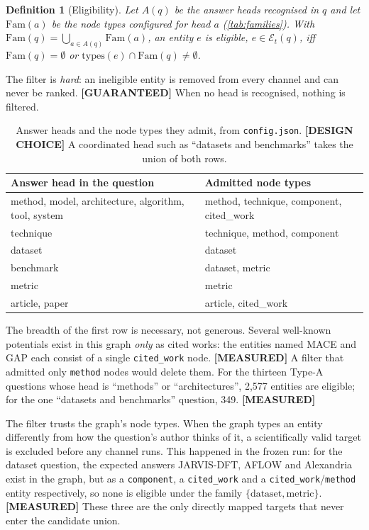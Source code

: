 \documentclass[11pt,a4paper]{article}
\newcommand{\cref}[1]{\autoref{#1}}
\newtheorem{definition}{Definition}[section]
\theoremstyle{remark}
\newcommand{\code}[1]{\texttt{\small #1}}
\newcommand{\Ent}{\mathcal{E}}
\newcommand{\vtag}[2]{{\sffamily\scriptsize\bfseries\textcolor{#1}{[#2]}}}
\newcommand{\Gtag}{\vtag{accent}{GUARANTEED}}
\newcommand{\Mtag}{\vtag{measgreen}{MEASURED}}
\newcommand{\Dtag}{\vtag{black!60}{DESIGN CHOICE}}
\begin{document}
\begin{definition}[Eligibility]
\label{def:eligible}
Let $A(q)$ be the answer heads recognised in $q$ and let $\mathrm{Fam}(a)$ be the node
types configured for head $a$ (\cref{tab:families}). With
$\mathrm{Fam}(q)=\bigcup_{a\in A(q)}\mathrm{Fam}(a)$, an entity $e$ is eligible,
$e\in\Ent_t(q)$, iff $\mathrm{Fam}(q)=\emptyset$ or
$\mathrm{types}(e)\cap\mathrm{Fam}(q)\neq\emptyset$.
\end{definition}

The filter is \emph{hard}: an ineligible entity is removed from every channel and can
never be ranked. \Gtag{} When no head is recognised, nothing is filtered.

\begin{table}[!htbp]
\centering
\caption[Answer heads and admitted node types]{Answer heads and the node types they admit, from \code{config.json}. \Dtag{} A
coordinated head such as ``datasets and benchmarks'' takes the union of both rows.}
\label{tab:families}
\small
\begin{tabularx}{\linewidth}{p{6.2cm}X}
\toprule
Answer head in the question & Admitted node types\\
\midrule
method, model, architecture, algorithm, tool, system & method, technique, component, cited\_work\\
technique & technique, method, component\\
dataset & dataset\\
benchmark & dataset, metric\\
metric & metric\\
article, paper & article, cited\_work\\
\bottomrule
\end{tabularx}
\end{table}

The breadth of the first row is necessary, not generous. Several well-known potentials
exist in this graph \emph{only} as cited works: the entities named MACE and GAP each
consist of a single \code{cited\_work} node. \Mtag{} A filter that admitted only
\code{method} nodes would delete them. For the thirteen Type-A questions whose head is
``methods'' or ``architectures'', 2{,}577 entities are eligible; for the one
``datasets and benchmarks'' question, 349. \Mtag

\begin{cautionbox}
The filter trusts the graph's node types. When the graph types an entity differently from
how the question's author thinks of it, a scientifically valid target is excluded before
any channel runs. This happened in the frozen run: for the dataset question, the expected
answers JARVIS-DFT, AFLOW and Alexandria exist in the graph, but as a \code{component}, a
\code{cited\_work} and a \code{cited\_work}/\code{method} entity respectively, so none is
eligible under the family $\{\text{dataset},\text{metric}\}$. \Mtag{} These three are the
only directly mapped targets that never enter the candidate union.
\end{cautionbox}
\end{document}

